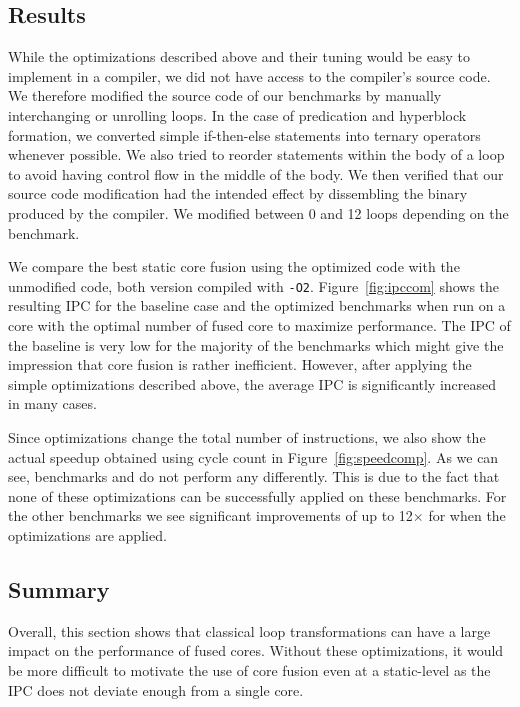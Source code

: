 \vspace{5mm}
\subsection{Results}

While the optimizations described above and their tuning would be easy to implement in a compiler, we did not have access to the compiler's source code.
We therefore modified the source code of our benchmarks by manually interchanging or unrolling loops.
In the case of predication and hyperblock formation, we converted simple if-then-else statements into ternary operators whenever possible.
We also tried to reorder statements within the body of a loop to avoid having control flow in the middle of the body.
We then verified that our source code modification had the intended effect by dissembling the binary produced by the compiler.
We modified between 0 and 12 loops depending on the benchmark.

We compare the best static core fusion using the optimized code with the unmodified code, both version compiled with \texttt{-O2}.
Figure~\ref{fig:ipccom} shows the resulting IPC for the baseline case and the optimized benchmarks when run on a core with the optimal number of fused core to maximize performance.
The IPC of the baseline is very low for the majority of the benchmarks which might give the impression that core fusion is rather inefficient.
However, after applying the simple optimizations described above, the average IPC is significantly increased in many cases.

Since optimizations change the total number of instructions, we also show the actual speedup obtained using cycle count in Figure~\ref{fig:speedcomp}.
As we can see, benchmarks  and  do not perform any differently.
This is due to the fact that none of these optimizations can be successfully applied on these benchmarks.
For the other benchmarks we see significant improvements of up to 12$\times$ for  when the optimizations are applied.

\subsection{Summary}

Overall, this section shows that classical loop transformations can have a large impact on the performance of fused cores.
Without these optimizations, it would be more difficult to motivate the use of core fusion even at a static-level as the IPC does not deviate enough from a single core.
